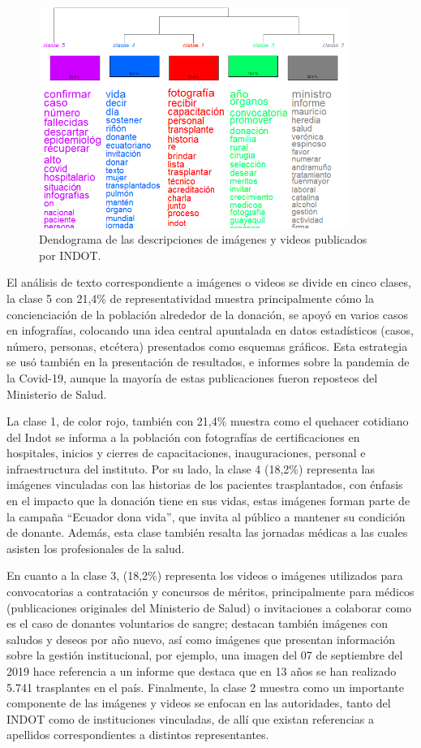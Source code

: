 \documentclass[spanish]{textolivre}
\begin{document}
\begin{figure}[htbp]
 \centering
 \includegraphics[width=0.9\textwidth]{figure03.png}
 \caption{Dendograma de las descripciones de imágenes y videos publicados por INDOT.}
 \label{fig3}
\end{figure}

El análisis de texto correspondiente a imágenes o videos se divide en cinco clases, la clase 5 con 21,4\% de representatividad muestra principalmente cómo la concienciación de la población alrededor de la donación, se apoyó en varios casos en infografías, colocando una idea central apuntalada en datos estadísticos (casos, número, personas, etcétera) presentados como esquemas gráficos. Esta estrategia se usó también en la presentación de resultados, e informes sobre la pandemia de la Covid-19, aunque la mayoría de estas publicaciones fueron reposteos del Ministerio de Salud.

La clase 1, de color rojo, también con 21,4\% muestra como el quehacer cotidiano del Indot se informa a la población con fotografías de certificaciones en hospitales, inicios y cierres de capacitaciones, inauguraciones, personal e infraestructura del instituto. Por su lado, la clase 4 (18,2\%) representa las imágenes vinculadas con las historias de los pacientes trasplantados, con énfasis en el impacto que la donación tiene en sus vidas, estas imágenes forman parte de la campaña “Ecuador dona vida”, que invita al público a mantener su condición de donante. Además, esta clase también resalta las jornadas médicas a las cuales asisten los profesionales de la salud.

En cuanto a la clase 3, (18,2\%) representa los videos o imágenes utilizados para convocatorias a contratación y concursos de méritos, principalmente para médicos (publicaciones originales del Ministerio de Salud) o invitaciones a colaborar como es el caso de donantes voluntarios de sangre; destacan también imágenes con saludos y deseos por año nuevo, así como imágenes que presentan información sobre la gestión institucional, por ejemplo, una imagen del 07 de septiembre del 2019 hace referencia a un informe que destaca que en 13 años se han realizado 5.741 trasplantes en el país. Finalmente, la clase 2 muestra como un importante componente de las imágenes y videos se enfocan en las autoridades, tanto del INDOT como de instituciones vinculadas, de allí que existan referencias a apellidos correspondientes a distintos representantes.
\end{document}
